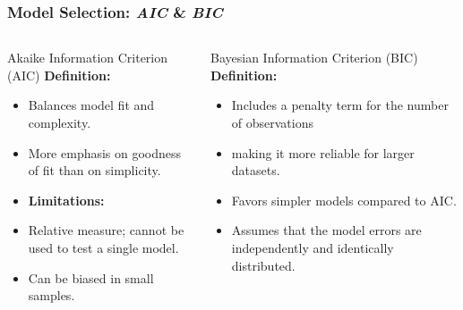 \documentclass[aspectratio=169,hyperref={pdfpagelabels=false}]{beamer}
\begin{document}
\begin{frame}
  \frametitle{Model Selection: \textit{AIC} \& \textit{BIC}}
  \begin{columns}
    \begin{column}{0.5\textwidth}
      \begin{block}{Akaike Information Criterion (AIC)}
        \textbf{Definition:} 
        \begin{itemize}
          \item Balances model fit and complexity.
          \item More emphasis on goodness of fit than on simplicity.
            \item [] \textbf{Limitations:}
            \item Relative measure; cannot be used to test a single model.
            \item Can be biased in small samples.
        \end{itemize}
      \end{block}
    \end{column}
    
    \begin{column}{0.5\textwidth}
      \begin{block}{Bayesian Information Criterion (BIC)}
        \textbf{Definition:}
        \begin{itemize}
          \item Includes a penalty term for the number of observations
          \item making it more reliable for larger datasets.
          \item Favors simpler models compared to AIC.
          \item Assumes that the model errors are independently and identically distributed.
        \end{itemize}
      \end{block}
    \end{column}
  \end{columns}
\end{frame}
\end{document}
